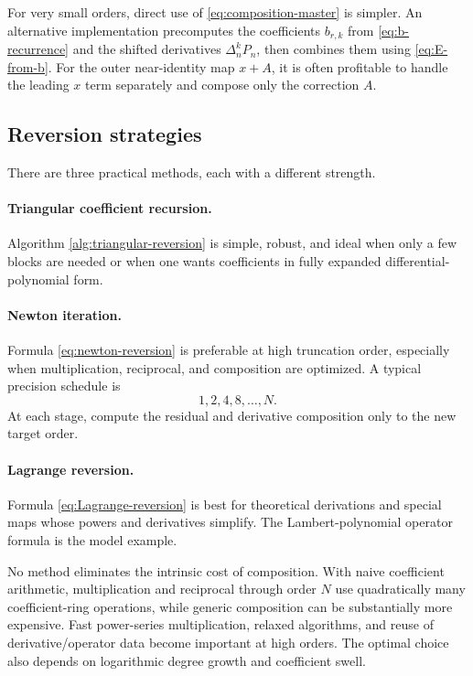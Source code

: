 \documentclass[11pt]{article}
\theoremstyle{pltheorem}
\begin{document}
For very small orders, direct use of \cref{eq:composition-master} is
simpler.  An alternative implementation precomputes the coefficients
\(b_{r,k}\) from \cref{eq:b-recurrence} and the shifted derivatives
\(\Delta_n^kP_n\), then combines them using \cref{eq:E-from-b}.  For the
outer near-identity map \(x+A\), it is often profitable to handle the
leading \(x\) term separately and compose only the correction \(A\).

\subsection{Reversion strategies}

There are three practical methods, each with a different strength.

\paragraph{Triangular coefficient recursion.}
Algorithm \ref{alg:triangular-reversion} is simple, robust, and ideal when only a few blocks are needed or when one wants coefficients in fully expanded differential-polynomial form.

\paragraph{Newton iteration.}
Formula \cref{eq:newton-reversion} is preferable at high truncation order, especially when multiplication, reciprocal, and composition are optimized.  A typical precision schedule is
\[
 1,2,4,8,\ldots,N.
\]
At each stage, compute the residual and derivative composition only to the new target order.

\paragraph{Lagrange reversion.}
Formula \cref{eq:Lagrange-reversion} is best for theoretical derivations and special maps whose powers and derivatives simplify.  The Lambert-polynomial operator formula is the model example.

No method eliminates the intrinsic cost of composition.  With naive coefficient arithmetic, multiplication and reciprocal through order \(N\) use quadratically many coefficient-ring operations, while generic composition can be substantially more expensive.  Fast power-series multiplication, relaxed algorithms, and reuse of derivative/operator data become important at high orders.  The optimal choice also depends on logarithmic degree growth and coefficient swell.
\end{document}
